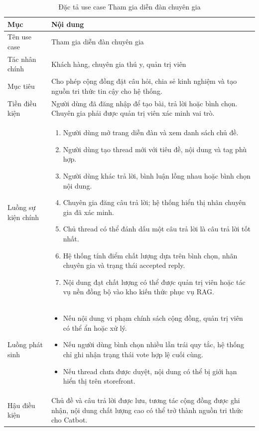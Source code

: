 \documentclass[../DoAn.tex]{subfiles}
\begin{document}
{\normalsize
\setlength{\LTleft}{\fill}
\setlength{\LTright}{\fill}
\setlength{\tabcolsep}{5pt}
\renewcommand{\arraystretch}{1.25}
\begin{longtable}{|p{3.2cm}|p{10.4cm}|}
\caption{Đặc tả use case Tham gia diễn đàn chuyên gia}
\label{table:2.10}\\
\hline
\textbf{Mục} & \textbf{Nội dung} \\ \hline
Tên use case & Tham gia diễn đàn chuyên gia \\ \hline
Tác nhân chính & Khách hàng, chuyên gia thú y, quản trị viên \\ \hline
Mục tiêu & Cho phép cộng đồng đặt câu hỏi, chia sẻ kinh nghiệm và tạo nguồn tri thức tin cậy cho hệ thống. \\ \hline
Tiền điều kiện & Người dùng đã đăng nhập để tạo bài, trả lời hoặc bình chọn. Chuyên gia phải được quản trị viên xác minh vai trò. \\ \hline
Luồng sự kiện chính &
\begin{minipage}[t]{10.1cm}
\begin{enumerate}[leftmargin=*,topsep=0pt,itemsep=0pt]
    \item Người dùng mở trang diễn đàn và xem danh sách chủ đề.
    \item Người dùng tạo thread mới với tiêu đề, nội dung và tag phù hợp.
    \item Người dùng khác trả lời, bình luận lồng nhau hoặc bình chọn nội dung.
    \item Chuyên gia đăng câu trả lời; hệ thống hiển thị nhãn chuyên gia đã xác minh.
    \item Chủ thread có thể đánh dấu một câu trả lời là câu trả lời tốt nhất.
    \item Hệ thống tính điểm chất lượng dựa trên bình chọn, nhãn chuyên gia và trạng thái accepted reply.
    \item Nội dung đạt chất lượng có thể được quản trị viên hoặc tác vụ nền đồng bộ vào kho kiến thức phục vụ RAG.
\end{enumerate}
\end{minipage} \\ \hline
Luồng phát sinh &
\begin{minipage}[t]{10.1cm}
\begin{itemize}[leftmargin=*,topsep=0pt,itemsep=0pt]
    \item Nếu nội dung vi phạm chính sách cộng đồng, quản trị viên có thể ẩn hoặc xử lý.
    \item Nếu người dùng bình chọn nhiều lần trái quy tắc, hệ thống chỉ ghi nhận trạng thái vote hợp lệ cuối cùng.
    \item Nếu thread chưa được duyệt, nội dung có thể bị giới hạn hiển thị trên storefront.
\end{itemize}
\end{minipage} \\ \hline
Hậu điều kiện & Chủ đề và câu trả lời được lưu, tương tác cộng đồng được ghi nhận, nội dung chất lượng cao có thể trở thành nguồn tri thức cho Catbot. \\ \hline
\end{longtable}
}
\end{document}
